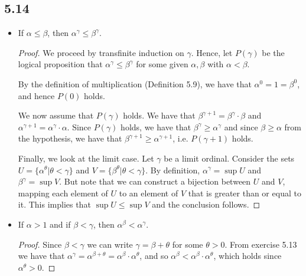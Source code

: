 \subsection*{5.14}

\begin{itemize}
    \item If $\alpha \leq \beta$, then $\alpha ^\gamma \leq \beta^{\gamma}$.
    \begin{proof}
        We proceed by transfinite induction on $\gamma$. Hence, let $P(\gamma)$ be the logical proposition that $\alpha ^\gamma \leq \beta^{\gamma}$ for some given $\alpha, \beta$ with $\alpha < \beta$.

        By the definition of multiplication (Definition 5.9), we have that $\alpha ^ 0 = 1 = \beta^0$, and hence $P(0)$ holds.

        We now assume that $P(\gamma)$ holds. We have that $\beta^{\gamma+1} = \beta^{\gamma} \cdot \beta$ and $\alpha^{\gamma+1} = \alpha^\gamma \cdot \alpha$. Since $P(\gamma)$ holds, we have that $\beta^{\gamma} \geq \alpha^{\gamma}$ and since $\beta \geq \alpha$ from the hypothesis, we have that $\beta^{\gamma+1} \geq \alpha^{\gamma+1}$, i.e. $P(\gamma+1)$ holds.

        Finally, we look at the limit case. Let $\gamma$ be a limit ordinal. Consider the sets $U = \{\alpha^\theta | \theta < \gamma\}$ and $V = \{\beta^\theta | \theta < \gamma\}$. By definition, $\alpha^\gamma = \sup U$ and $\beta ^\gamma = \sup V$. But note that we can construct a bijection between $U$ and $V$, mapping each element of $U$ to an element of $V$ that is greater than or equal to it. This implies that $\sup U \leq \sup V$ and the conclusion follows.
    \end{proof}

    \item If $\alpha > 1$ and if $\beta < \gamma$, then $\alpha^{\beta} < \alpha ^{\gamma}$.
    \begin{proof}
        Since $\beta < \gamma$ we can write $\gamma = \beta + \theta$ for some $\theta > 0$. From exercise 5.13 we have that $\alpha^\gamma = \alpha^{\beta + \theta} = \alpha^\beta \cdot \alpha^\theta$, and so $\alpha^\beta < \alpha^\beta \cdot \alpha^\theta$, which holds since $\alpha^\theta > 0$.
    \end{proof}
\end{itemize}

